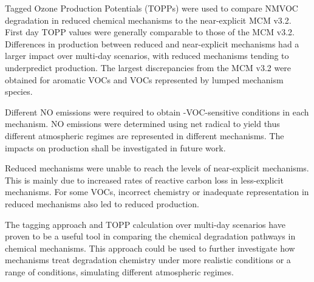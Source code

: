 Tagged Ozone Production Potentials (TOPPs) were used to compare NMVOC degradation in reduced chemical mechanisms to the near-explicit MCM v3.2. 
First day TOPP values were generally comparable to those of the MCM v3.2.
Differences in  production between reduced and near-explicit mechanisms had a larger impact over multi-day scenarios, with reduced mechanisms tending to underpredict  production.  
The largest discrepancies from the MCM v3.2 were obtained for aromatic VOCs and VOCs represented by lumped mechanism species.

Different NO emissions were required to obtain -VOC-sensitive conditions in each mechanism.
NO emissions were determined using net radical to  yield thus different atmospheric regimes are represented in different mechanisms.
The impacts on  production shall be investigated in future work.

Reduced mechanisms were unable to reach the  levels of near-explicit mechanisms.
This is mainly due to increased rates of reactive carbon loss in less-explicit mechanisms.
For some VOCs, incorrect chemistry or inadequate representation in reduced mechanisms also led to reduced  production.

The tagging approach and TOPP calculation over multi-day scenarios have proven to be a useful tool in comparing the chemical degradation pathways in chemical mechanisms. 
This approach could be used to further investigate how mechanisms treat degradation chemistry under more realistic  conditions or a range of  conditions, simulating different atmospheric regimes. 
